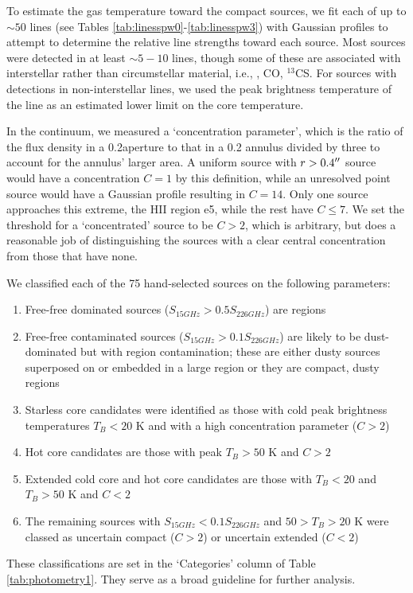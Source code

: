 \documentclass{emulateapj}
\begin{document}
To estimate the gas temperature toward the compact sources, we fit each of up
to $\sim50$ lines (see Tables \ref{tab:linesspw0}-\ref{tab:linesspw3}) with
Gaussian profiles to attempt to determine the relative line strengths toward
each source.  Most sources were detected in at least $\sim5-10$ lines, though
some of these are associated with interstellar rather than circumstellar
material, i.e., \formaldehyde, CO, $^{13}$CS.  For sources with detections in
non-interstellar lines, we used the peak brightness temperature of the line as
an estimated lower limit on the core temperature.

In the continuum, we measured a `concentration parameter', which is the ratio
of the flux density in a 0.2\arcsec aperture to that in a 0.2\arcsec
annulus divided by three to account for the annulus' larger area.  A uniform
source with $r>0.4\mbox{$^{\prime\prime}$}$ source would have a concentration $C=1$ by this
definition, while an unresolved point source would have a Gaussian profile
resulting in $C=14$.  Only one source approaches this extreme, the HII region
e5, while the rest have $C\leq7$.  We set the threshold for a `concentrated'
source to be $C>2$, which is arbitrary, but does a reasonable job of
distinguishing the sources with a clear central concentration from those that
have none.


We classified each of the 75 hand-selected sources on the following parameters:
\begin{enumerate}
    \item Free-free dominated sources ($S_{15 GHz} > 0.5 S_{226 GHz}$) are \hii
        regions
    \item Free-free contaminated sources ($S_{15 GHz} > 0.1 S_{226 GHz}$) are
        likely to be dust-dominated but with \hii region contamination; these
        are either dusty sources superposed on or embedded in a large \hii
        region or they are compact, dusty \hii regions
    \item Starless core candidates were identified as those with cold peak
        brightness temperatures $T_B < 20$ K and with a high concentration
        parameter ($C>2$)
    \item Hot core candidates are those with peak $T_B>50$ K and $C>2$
    \item Extended cold core and hot core candidates are those with $T_B<20$ 
        and $T_B>50$ K and $C<2$
    \item The remaining sources with $S_{15 GHz} < 0.1 S_{226 GHz}$ and $50 >
        T_B > 20$ K were classed as uncertain compact ($C>2$) or uncertain extended
        ($C<2$)
\end{enumerate}

These classifications are set in the `Categories' column of Table
\ref{tab:photometry1}.  They serve as a broad guideline for further
analysis.   


\end{document}
